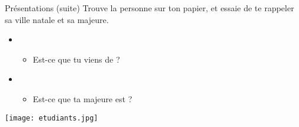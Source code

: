 \begin{frame}{Présentations (suite)}
  Trouve la personne sur ton papier, et essaie de te rappeler sa ville natale et sa majeure.
  \begin{itemize}
    \item {}
    \begin{itemize}
      \item<2->[$\to$] Est-ce que tu viens de \underline{\hspace{3cm}}?
    \end{itemize}
    \item {}
    \begin{itemize}
      \item<3->[$\to$] Est-ce que ta majeure est \underline{\hspace{3cm}}?
    \end{itemize}
  \end{itemize}
  \begin{center}
    \texttt{[image: etudiants.jpg]}
  \end{center}
\end{frame}